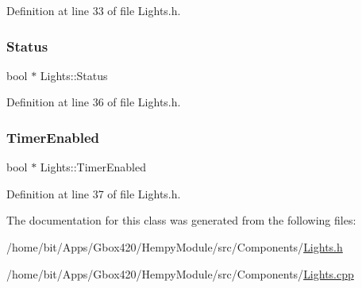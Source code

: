 Definition at line 33 of file Lights.\+h.

\mbox{\label{class_lights_a5f5ca6f90f96be38cbaa00cc6302eebd}} 
\subsubsection{\texorpdfstring{Status}{Status}}
{\footnotesize\ttfamily bool $\ast$ Lights\+::\+Status\hspace{0.3cm}{\ttfamily [protected]}}



Definition at line 36 of file Lights.\+h.

\mbox{\label{class_lights_a2b2938ba677b462b6a464c325b085945}} 
\subsubsection{\texorpdfstring{Timer\+Enabled}{TimerEnabled}}
{\footnotesize\ttfamily bool $\ast$ Lights\+::\+Timer\+Enabled\hspace{0.3cm}{\ttfamily [protected]}}



Definition at line 37 of file Lights.\+h.



The documentation for this class was generated from the following files\+:\begin{DoxyCompactItemize}
\item 
/home/bit/\+Apps/\+Gbox420/\+Hempy\+Module/src/\+Components/\hyperlink{_hempy_module_2src_2_components_2_lights_8h}{Lights.\+h}\item 
/home/bit/\+Apps/\+Gbox420/\+Hempy\+Module/src/\+Components/\hyperlink{_hempy_module_2src_2_components_2_lights_8cpp}{Lights.\+cpp}\end{DoxyCompactItemize}
